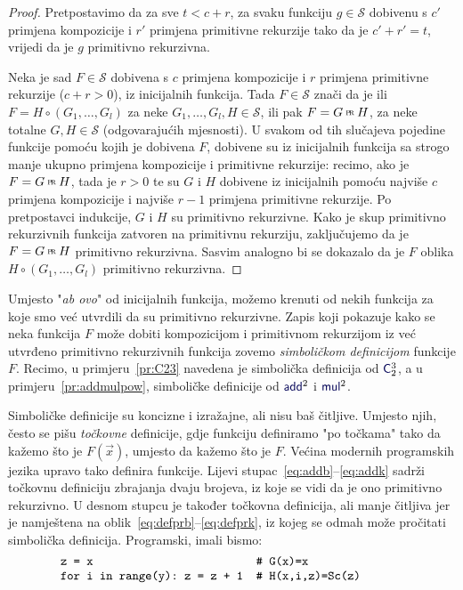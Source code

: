 \begin{proof}
Pretpostavimo da za sve $t<c+r$, za svaku funkciju $g\in\mathcal S$ dobivenu s $c'$ primjena kompozicije i $r'$ primjena primitivne rekurzije tako da je $c'+r'=t$, vrijedi da je $g$ primitivno rekurzivna.

    Neka je sad $F\in\mathcal S$ dobivena s $c$ primjena kompozicije i $r$ primjena primitivne rekurzije ($c+r>0$), iz inicijalnih funkcija. Tada $F\in\mathcal S$ znači da je ili $F=H\circ(G_1,\dotsc,G_l)$ za neke $G_1,\dotsc,G_l,H\in\mathcal S$, ili pak $F=G\pr H$, za neke totalne $G,H\in\mathcal S$ (odgovarajućih mjesnosti). U svakom od tih slučajeva pojedine funkcije pomoću kojih je dobivena $F$, dobivene su iz inicijalnih funkcija sa strogo manje ukupno primjena kompozicije i primitivne rekurzije: recimo, ako je $F=G\pr H$, tada je $r>0$ te su $G$ i $H$ dobivene iz inicijalnih pomoću najviše $c$ primjena kompozicije i najviše $r-1$ primjena primitivne rekurzije. Po pretpostavci indukcije, $G$ i $H$ su primitivno rekurzivne. Kako je skup primitivno rekurzivnih funkcija zatvoren na primitivnu rekurziju, zaključujemo da je $F=G\pr H$ primitivno rekurzivna. Sasvim analogno bi se dokazalo da je $F$ oblika $H\circ(G_1,\dotsc,G_l)$ primitivno rekurzivna.
\end{proof}

\begin{napomena}[{name=[ulančavanje simboličkih definicija]}]\label{nap:symbdef}
Umjesto "\emph{ab ovo}" od inicijalnih funkcija, možemo krenuti od nekih funkcija za koje smo već utvrdili da su primitivno rekurzivne. Zapis koji pokazuje kako se neka funkcija $F$ može dobiti kompozicijom i primitivnom rekurzijom iz već utvrđeno primitivno rekurzivnih funkcija zovemo \emph{simboličkom definicijom} funkcije $F$. Recimo, u primjeru~\ref{pr:C23} navedena je simbolička definicija od $\f C_2^3$, a u primjeru~\ref{pr:addmulpow}, simboličke definicije od $\f{add}^2$ i $\f{mul}^2$.
\end{napomena}

Simboličke definicije su koncizne i izražajne, ali nisu baš čitljive. Umjesto njih, često se pišu \emph{točkovne} definicije, gdje funkciju definiramo "po točkama" tako da kažemo što je $F(\vec x)$, umjesto da kažemo što je $F$. Većina modernih programskih jezika upravo tako definira funkcije. Lijevi stupac~\eqref{eq:addb}--\eqref{eq:addk} sadrži točkovnu definiciju zbrajanja dvaju brojeva, iz koje se vidi da je ono primitivno rekurzivno. U desnom stupcu je također točkovna definicija, ali manje čitljiva jer je namještena na oblik~\eqref{eq:defprb}--\eqref{eq:defprk}, iz kojeg se odmah može pročitati simbolička definicija. Programski, imali bismo:
\begin{equation}
	\begin{minipage}{0.8\textwidth}
		\begin{verbatim}
z = x                         # G(x)=x
for i in range(y): z = z + 1  # H(x,i,z)=Sc(z)
		\end{verbatim}
	\end{minipage}
\end{equation}


